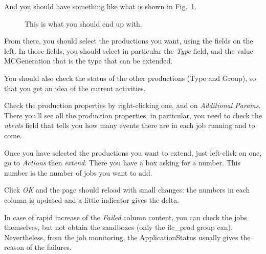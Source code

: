 \documentclass[a4paper,12pt]{article}
\begin{document}
And you should have something like what is shown in Fig.~\ref{fig:welcome3}.
\begin{figure}[h]
\begin{center}
\end{center}
\caption{This is what you should end up with.}\label{fig:welcome3}
\end{figure}
From there, you should select the productions you want, using the fields on the
left. In those fields, you should select in particular the \emph{Type} field,
and the value {\color{red}MCGeneration} that is the type that can be extended.

You should also check the status of the other productions (Type and Group), so
that you get an idea of the current activities.

Check the production properties by right-clicking one, and on \emph{Additional
Params}. There you'll see all the production properties, in particular, you
need to check the \emph{nbevts} field that tells you how many events there are in
each job running and to come.

Once you have selected the productions you want to extend, just left-click on
one, go to \emph{Actions} then \emph{extend}. There you have a box asking for a
number. This number is the number of jobs you want to add.

Click \emph{OK} and the page should reload with small changes: the numbers in
each column is updated and a little indicator gives the delta. 

In case of rapid increase of the \emph{Failed} column content, you can check the
jobs themselves, but not obtain the sandboxes (only the ilc\_prod group can).
Nevertheless, from the job monitoring, the ApplicationStatus usually gives the
reason of the failures. 
\end{document}
